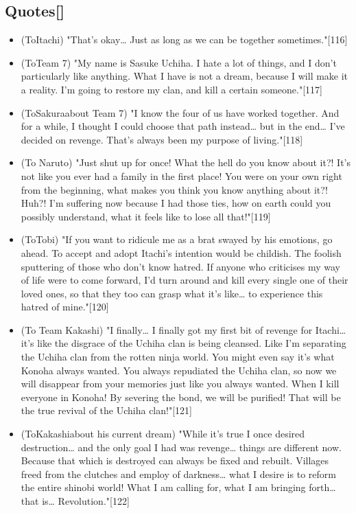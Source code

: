 \documentclass[a4paper,12pt]{article}
\begin{document}
\subsection*{Quotes[]}\n\n\begin{itemize}
\item (ToItachi) "That's okay… Just as long as we can be together sometimes."[116]
\item (ToTeam 7) "My name is Sasuke Uchiha. I hate a lot of things, and I don't particularly like anything. What I have is not a dream, because I will make it a reality. I'm going to restore my clan, and kill a certain someone."[117]
\item (ToSakuraabout Team 7) "I know the four of us have worked together. And for a while, I thought I could choose that path instead… but in the end… I've decided on revenge. That's always been my purpose of living."[118]
\item (To Naruto) "Just shut up for once! What the hell do you know about it?! It's not like you ever had a family in the first place! You were on your own right from the beginning, what makes you think you know anything about it?! Huh?! I'm suffering now because I had those ties, how on earth could you possibly understand, what it feels like to lose all that!"[119]
\item (ToTobi) "If you want to ridicule me as a brat swayed by his emotions, go ahead. To accept and adopt Itachi's intention would be childish. The foolish sputtering of those who don't know hatred. If anyone who criticises my way of life were to come forward, I'd turn around and kill every single one of their loved ones, so that they too can grasp what it's like… to experience this hatred of mine."[120]
\item (To Team Kakashi) "I finally… I finally got my first bit of revenge for Itachi… it's like the disgrace of the Uchiha clan is being cleansed. Like I'm separating the Uchiha clan from the rotten ninja world. You might even say it's what Konoha always wanted. You always repudiated the Uchiha clan, so now we will disappear from your memories just like you always wanted. When I kill everyone in Konoha! By severing the bond, we will be purified! That will be the true revival of the Uchiha clan!"[121]
\item (ToKakashiabout his current dream) "While it's true I once desired destruction… and the only goal I had was revenge… things are different now. Because that which is destroyed can always be fixed and rebuilt. Villages freed from the clutches and employ of darkness… what I desire is to reform the entire shinobi world! What I am calling for, what I am bringing forth… that is… Revolution."[122]

\end{itemize}
\end{document}
